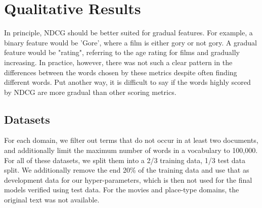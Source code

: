 

\section{Qualitative Results}
In principle, NDCG should be better suited for gradual features. For example, a binary feature would be 'Gore', where a film is either gory or not gory. A gradual feature would be "rating", referring to the age rating for films and gradually increasing. In practice, however, there was not such a clear pattern in the differences between the words chosen by these metrics despite often finding different words. Put another way, it is difficult to say if the words highly scored by NDCG are more gradual than other scoring metrics.
\subsection{Datasets}\label{ch3:datasets}



 For each domain, we filter out terms that do not occur in at least two documents, and additionally limit the maximum number of words in a vocabulary to 100,000. For all of these datasets, we split them into a 2/3 training data, 1/3 test data split. We additionally remove the end 20\% of the training data and use that as development data for our hyper-parameters, which is then not used for the final models verified using test data.  For the movies and place-type domains, the original text was not available.



